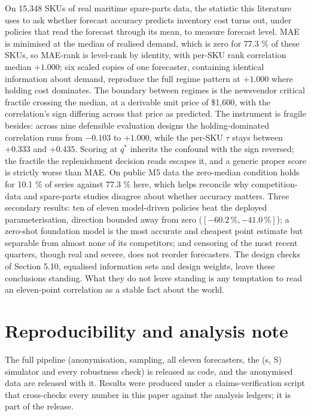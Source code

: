 \documentclass[11pt]{article}
\begin{document}
On 15{,}348 SKUs of real maritime spare-parts data, the statistic this
literature uses to ask whether forecast accuracy predicts inventory cost turns
out, under policies that read the forecast through its mean, to measure
forecast level. MAE is minimised at the median of realised
demand, which is zero for 77.3 \% of these SKUs, so MAE-rank is level-rank by
identity, with per-SKU rank correlation median $+1.000$; six scaled copies of
one forecaster, containing identical information about demand, reproduce the
full regime pattern at $+1.000$ where holding cost dominates. The boundary
between regimes is the newsvendor critical fractile crossing the median, at a
derivable unit price of \$1{,}600, with the correlation's sign differing
across that price as predicted.
The instrument is fragile besides: across nine defensible evaluation designs
the holding-dominated correlation runs from $-0.103$ to $+1.000$, while the
per-SKU $\tau$ stays between $+0.333$ and $+0.435$. Scoring at $q^\ast$
inherits the confound with the sign reversed; the fractile the replenishment
decision reads escapes it, and a generic proper score is strictly worse than
MAE. On public M5 data the zero-median condition holds for
10.1 \% of series against 77.3 \% here, which helps reconcile why competition-data
and spare-parts studies disagree about whether accuracy matters. Three
secondary results: ten of eleven model-driven policies beat the deployed
parameterisation, direction bounded away from zero ($[-60.2\,\%, -41.0\,\%]$);
a zero-shot foundation model is the most accurate and cheapest point estimate
but separable from almost none of its competitors; and censoring of the most
recent quarters, though real and severe, does not reorder forecasters. The
design checks of Section 5.10, equalised information sets and design weights,
leave these conclusions standing. What they do not leave standing is any
temptation to read an eleven-point correlation as a stable fact about the
world.

\section*{Reproducibility and analysis note}

The full pipeline (anonymisation, sampling, all eleven forecasters, the (s, S)
simulator and every robustness check) is released as code, and the anonymised
data are released with it. Results were produced under a claims-verification
script that cross-checks every number in this paper against the analysis
ledgers; it is part of the release.
\end{document}
